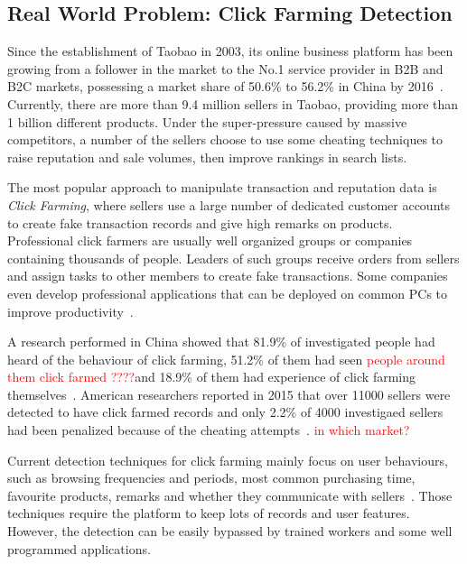 \documentclass[10pt,conference,letterpaper]{IEEEtran}
\begin{document}
		\subsection{Real World Problem: Click Farming Detection}\label{sec:related-realworld}
			Since the establishment of Taobao in 2003, its online business platform has been growing from a follower in the market to the No.1 service provider in B2B and B2C markets, possessing a market share of 50.6\% to 56.2\% in China by 2016~\cite{iresearch2016b2c}. Currently, there are more than 9.4 million sellers in Taobao, providing more than 1 billion different products. Under the super-pressure caused by massive competitors, a number of the sellers choose to use some cheating techniques to raise reputation and sale volumes, then improve rankings in search lists.
			
			The most popular approach to manipulate transaction and reputation data is \textit{Click Farming}, where sellers use a large number of dedicated customer accounts to create fake transaction records and give high remarks on products. Professional click farmers are usually well organized groups or companies containing thousands of people. Leaders of such groups receive orders from sellers and assign tasks to other members to create fake transactions. Some companies even develop professional applications that can be deployed on common PCs to improve productivity~\cite{zhao2016on}.
	
			A research performed in China showed that 81.9\% of investigated people had heard of the behaviour of click farming, 51.2\% of them had seen \textcolor{red}{people around them click farmed ????}and 18.9\% of them had experience of click farming themselves~\cite{yan2015report}. American researchers reported in 2015 that over 11000 sellers were detected to have click farmed records and only 2.2\% of 4000 investigaed sellers had been penalized because of the cheating attempts~\cite{netease2015research}. \textcolor{red}{in which market?}
			
			Current detection techniques for click farming mainly focus on user behaviours, such as browsing frequencies and periods, most common purchasing time, favourite products, remarks and whether they communicate with sellers~\cite{simpleDetection}. Those techniques require the platform to keep lots of records and user features. However, the detection can be easily bypassed by trained workers and some well programmed applications.
\end{document}
